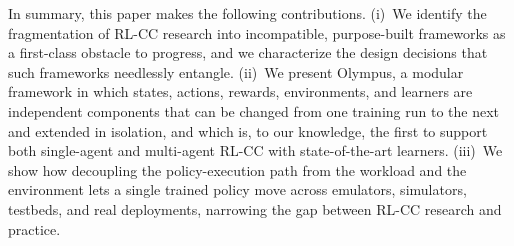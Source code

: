 In summary, this paper makes the following contributions. (i)~We identify the
fragmentation of RL-CC research into incompatible, purpose-built frameworks as
a first-class obstacle to progress, and we characterize the design decisions
that such frameworks needlessly entangle. (ii)~We present Olympus, a modular
framework in which states, actions, rewards, environments, and learners are
independent components that can be changed from one training run to the next and
extended in isolation, and which is, to our knowledge, the first to support both
single-agent and multi-agent RL-CC with state-of-the-art learners. (iii)~We
show how decoupling the policy-execution path from the workload and the
environment lets a single trained policy move across emulators, simulators,
testbeds, and real deployments, narrowing the gap between RL-CC research and
practice.
